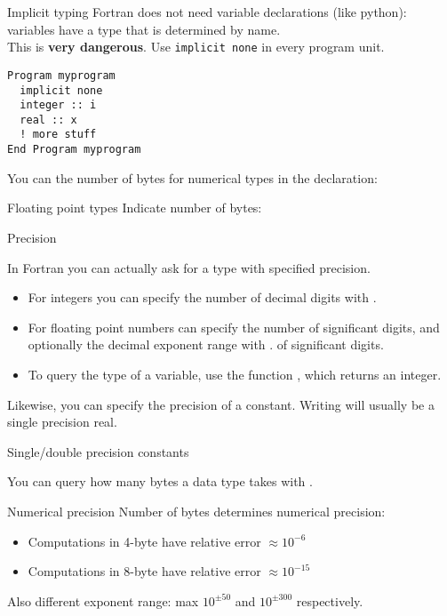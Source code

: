 \begin{slide}{Implicit typing}
  \label{sl:fimplicit}
  Fortran does not need variable declarations (like python):\\
  variables have a type that is determined by name.\\
  This is \textbf{very dangerous}. Use \lstinline{implicit none}
  in every program unit.
\begin{lstlisting}
Program myprogram
  implicit none
  integer :: i
  real :: x
  ! more stuff
End Program myprogram
\end{lstlisting}
\end{slide}

You can the number of bytes for numerical types in the declaration:
%

\begin{slide}{Floating point types}
  \label{sl:ffloat}
  Indicate number of bytes:
\end{slide}

 {Precision}
\label{sec:fprecision}

In Fortran you can actually ask for a type with specified precision.
\begin{itemize}
\item For integers you can specify the number of decimal digits with
  .
\item For floating point numbers can specify the number of
  significant digits, and optionally the decimal exponent range with
  .
  of significant digits.
\item To query the type of a variable, use the function
  , which returns an integer.
\end{itemize}

Likewise, you can specify the precision of a constant.
Writing  will usually be a single precision
real. 

\begin{block}{Single/double precision constants}
  \label{sl:fsingledouble}
\end{block}

You can query how many bytes a data type takes with
.

\begin{block}{Numerical precision}
  \label{sl:fprecision48}
  Number of bytes determines numerical precision:
  \begin{itemize}
  \item Computations in 4-byte have relative error $\approx 10^{-6}$
  \item Computations in 8-byte have relative error $\approx 10^{-15}$
  \end{itemize}
  Also different exponent range: max $10^{\pm 50}$ and $10^{\pm 300}$ respectively.
\end{block}

